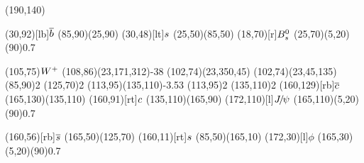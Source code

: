 \documentclass{standalone}
\begin{document}
\begin{axopicture}(190,140)

  \Text(30,92)[lb]{${\overline {{b}}}$}                 %
  \Line[arrow](85,90)(25,90)                     %
  \Text(30,48)[lt]{${s}$}                    %
  \Line[arrow](25,50)(85,50)                     %
  \Text(18,70)[r]{${{B}^0_{s}}$}                         %
  \GOval(25,70)(5,20)(90){0.7}                   %
                                                 
  \Text(105,75){\small{${W^+}$}}                   %
  \PhotonArc(108,86)(23,171,312){-3}{8}          %
  \Arc[arrow,arrowpos=0.65](102,74)(23,350,45)   %
  \Arc[arrow,arrowpos=0.55](102,74)(23,45,135)   %
  \Vertex(85,90){2}                              %
  \Vertex(125,70){2}                             %
  \Gluon(113,95)(135,110){-3.5}{3}               %
  \Vertex(113,95){2}                             %
  \Vertex(135,110){2}                            %
  \Text(160,129)[rb]{${\overline {{c}}}$}               %
  \Line[arrow](165,130)(135,110)                 %
  \Text(160,91)[rt]{${c}$}                   %
  \Line[arrow](135,110)(165,90)                  %
  \Text(172,110)[l]{${{J\mskip -3mu/\mskip -2mu\psi}}$}                     %
  \GOval(165,110)(5,20)(90){0.7}                 %
                                                 
  \Text(160,56)[rb]{${\overline {{s}}}$}                %
  \Line[arrow](165,50)(125,70)                   %
  \Text(160,11)[rt]{${s}$}                   %
  \Line[arrow](85,50)(165,10)                    %
  \Text(172,30)[l]{$\phi$}                       %
  \GOval(165,30)(5,20)(90){0.7}                  %
                                                 
\end{axopicture}
\end{document}
